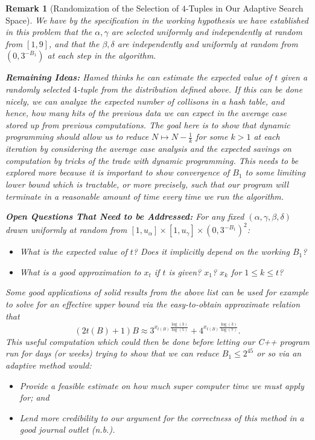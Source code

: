 \documentclass[12pt]{article}
\newtheorem{remark}[theorem]{Remark}
\begin{document}
\begin{remark}[Randomization of the Selection of $4$-Tuples in Our Adaptive Search Space] 
We have by the specification in the working hypothesis we have established in this problem that the 
$\alpha,\gamma$ are selected uniformly and independently at random from $[1, 9]$, and that the 
$\beta,\delta$ are independently and uniformly at random from $(0, 3^{-B_1})$ at each step in the 
algorithm. 

\noindent
\textbf{Remaining Ideas:} 
Hamed thinks he can estimate the expected value of $t$ given a randomly selected $4$-tuple from the 
distribution defined above. If this can be done nicely, we can analyze the expected number of collisons in a 
hash table, and hence, how many hits of the previous data we can expect in the average case stored up from 
previous computations. \emph{The goal here is to show that dynamic programming should allow us to reduce 
$N \mapsto N-\frac{1}{k}$ for some $k > 1$ at each iteration by considering the average case analysis and the 
expected savings on computation by tricks of the trade with dynamic programming.} This needs to be 
explored more because it is important to show convergence of $B_1$ to some limiting lower bound which is 
tractable, or more precisely, such that our program will terminate in a reasonable amount of 
time every time we run the algorithm. 

\noindent
\textbf{Open Questions That Need to be Addressed:} 
For any fixed $(\alpha,\gamma,\beta,\delta)$ drawn uniformly at random from 
$[1,u_{\alpha}] \times [1,u_{\gamma}] \times (0,3^{-B_1})^2$: 
\begin{itemize} 
\item What is the expected value of $t$? Does it implicitly depend on the working $B_1$? 
\item What is a good approximation to $x_t$ if $t$ is given? $x_1$? $x_k$ for $1 \leq k \leq t$? 
\end{itemize} 
Some good applications of solid results from the above list can be used for example to solve for an 
effective upper bound via the easy-to-obtain approximate relation that 
\[
(2t(B)+1) B \approx 3^{x_{t(B)} \frac{\log(3)}{\log(5)}} + 4^{x_{t(B)} \frac{\log(3)}{\log(7)}}. 
\]
This useful computation which could then be done before letting our C++ program run for days (or weeks) 
trying to show that we can reduce $B_1 \leq 2^{45}$ or so via an adaptive method would: 
\begin{itemize}
\item[\textbf{1.}] 
Provide a feasible estimate on how much super computer time we must apply for; and 
\item[\textbf{2.}]
Lend more 
credibility to our argument for the correctness of this method in a good journal outlet (n.b.). 
\end{itemize} 
\end{remark} 
\end{document}
